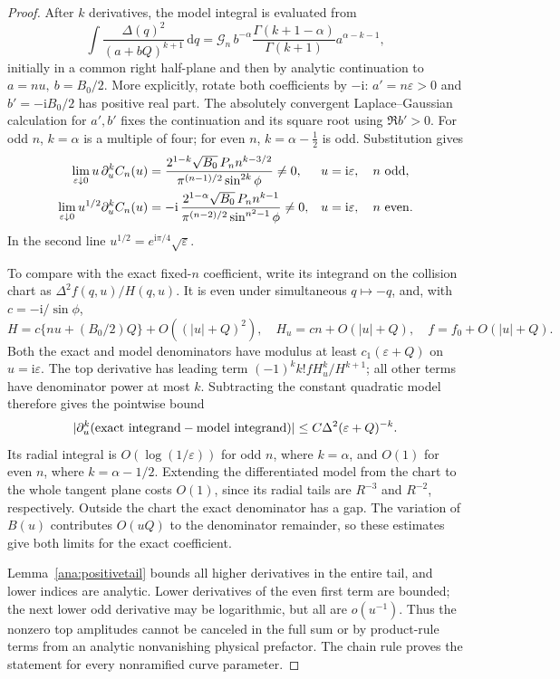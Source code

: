 \documentclass[11pt]{article}
\numberwithin{equation}{section}
\theoremstyle{definition}
\newcommand{\ii}{\mathrm i}
\newcommand{\dd}{\,\mathrm d}
\newcommand{\eps}{\varepsilon}
\begin{document}
\begin{proof}
After \(k\) derivatives, the model integral is evaluated from
\[
 \int\frac{\Delta(q)^2}{(a+bQ)^{k+1}}\dd q
 =\mathcal G_n\,b^{-\alpha}
    \frac{\Gamma(k+1-\alpha)}{\Gamma(k+1)}
    a^{\alpha-k-1},
\]
initially in a common right half-plane and then by analytic
continuation to \(a=nu,\ b=B_0/2\).
More explicitly, rotate both coefficients by \(-\ii\):
\(a'=n\eps>0\) and \(b'=-\ii B_0/2\) has positive real part.
The absolutely convergent Laplace--Gaussian calculation for
\(a',b'\) fixes the continuation and its square root using
\(\Re b'>0\).
For odd \(n\), \(k=\alpha\) is a multiple of four; for even
\(n\), \(k=\alpha-\tfrac12\) is odd. Substitution gives
\begin{align}
 \lim_{\eps\downarrow0}u\,\partial_u^k C_n(u)
 &=\frac{2^{1-k}\sqrt{B_0}\,P_n n^{k-3/2}}
         {\pi^{(n-1)/2}\sin^{2k}\phi}\ne0,
 &&u=\ii\eps,\quad n\ {\rm odd},\label{ana:oddamp}\\
 \lim_{\eps\downarrow0}u^{1/2}\partial_u^k C_n(u)
 &=-\ii\,\frac{2^{1-\alpha}\sqrt{B_0}\,P_n n^{k-1}}
         {\pi^{(n-2)/2}\sin^{n^2-1}\phi}\ne0,
 &&u=\ii\eps,\quad n\ {\rm even}.\label{ana:evenamp}
\end{align}
In the second line \(u^{1/2}=e^{\ii\pi/4}\sqrt\eps\).

To compare with the exact fixed-\(n\) coefficient, write its integrand
on the collision chart as
\(\Delta^2 f(q,u)/H(q,u)\). It is even under simultaneous
\(q\mapsto-q\), and, with \(c=-\ii/\sin\phi\),
\[
 H=c\{nu+(B_0/2)Q\}+O((|u|+Q)^2),\quad
 H_u=cn+O(|u|+Q),\quad f=f_0+O(|u|+Q).
\]
Both the exact and model denominators have modulus at least
\(c_1(\eps+Q)\) on \(u=\ii\eps\). The top derivative has
leading term \((-1)^kk! fH_u^k/H^{k+1}\); all other terms have
denominator power at most \(k\). Subtracting the constant quadratic
model therefore gives the pointwise bound
\[
 |\partial_u^k(\hbox{exact integrand}-\hbox{model integrand})|
       \le C\Delta^2(\eps+Q)^{-k}.
\]
Its radial integral is \(O(\log(1/\eps))\) for odd \(n\), where
\(k=\alpha\), and \(O(1)\) for even \(n\), where \(k=\alpha-1/2\).
Extending the differentiated model from the chart to the whole
tangent plane costs \(O(1)\), since its radial tails are
\(R^{-3}\) and \(R^{-2}\), respectively. Outside the chart the
exact denominator has a gap. The variation of \(B(u)\) contributes
\(O(uQ)\) to the denominator remainder, so these estimates give both
limits for the exact coefficient.

Lemma~\ref{ana:positivetail} bounds all higher derivatives in the
entire tail, and lower indices are analytic. Lower derivatives of
the even first term are bounded; the next lower odd derivative
may be logarithmic, but all are \(o(u^{-1})\).
Thus the nonzero top amplitudes cannot be canceled in the full
sum or by product-rule terms from an analytic nonvanishing
physical prefactor. The chain rule proves the statement for every
nonramified curve parameter.


\end{proof}
\end{document}
